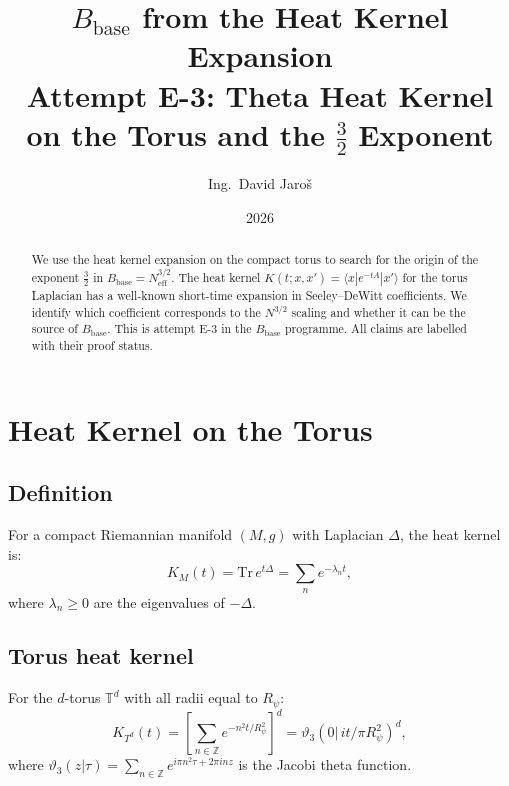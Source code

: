 \documentclass[11pt,a4paper]{article}
\title{$B_{\mathrm{base}}$ from the Heat Kernel Expansion\\
\large Attempt E-3: Theta Heat Kernel on the Torus and the $\tfrac{3}{2}$ Exponent}
\author{Ing.\ David Jaroš}
\date{2026}
\begin{document}
\maketitle

\begin{abstract}
We use the heat kernel expansion on the compact torus to search for the
origin of the exponent $\tfrac{3}{2}$ in $B_{\mathrm{base}} = N_{\mathrm{eff}}^{3/2}$.
The heat kernel $K(t; x, x') = \langle x | e^{-tA} | x'\rangle$ for the
torus Laplacian has a well-known short-time expansion in Seeley--DeWitt
coefficients.  We identify which coefficient corresponds to the
$N^{3/2}$ scaling and whether it can be the source of $B_{\mathrm{base}}$.
This is attempt E-3 in the $B_{\mathrm{base}}$ programme.
All claims are labelled with their proof status.
\end{abstract}

\tableofcontents

\section{Heat Kernel on the Torus}
\label{sec:heat_kernel}

\subsection{Definition}

For a compact Riemannian manifold $(M, g)$ with Laplacian $\Delta$, the
heat kernel is:
\begin{equation}
\label{eq:hk_def}
  K_M(t) = \mathrm{Tr}\, e^{t\Delta}
  = \sum_{n} e^{-\lambda_n t},
\end{equation}
where $\lambda_n \geq 0$ are the eigenvalues of $-\Delta$.

\subsection{Torus heat kernel}

For the $d$-torus $\mathbb{T}^d$ with all radii equal to $R_\psi$:
\begin{equation}
\label{eq:torus_hk}
  K_{T^d}(t)
  = \left[\sum_{n \in \mathbb{Z}} e^{-n^2 t/R_\psi^2}\right]^d
  = \vartheta_3(0|\, i t/\pi R_\psi^2)^d,
\end{equation}
where $\vartheta_3(z|\tau) = \sum_{n\in\mathbb{Z}} e^{i\pi n^2\tau + 2\pi inz}$
is the Jacobi theta function.
\end{document}
